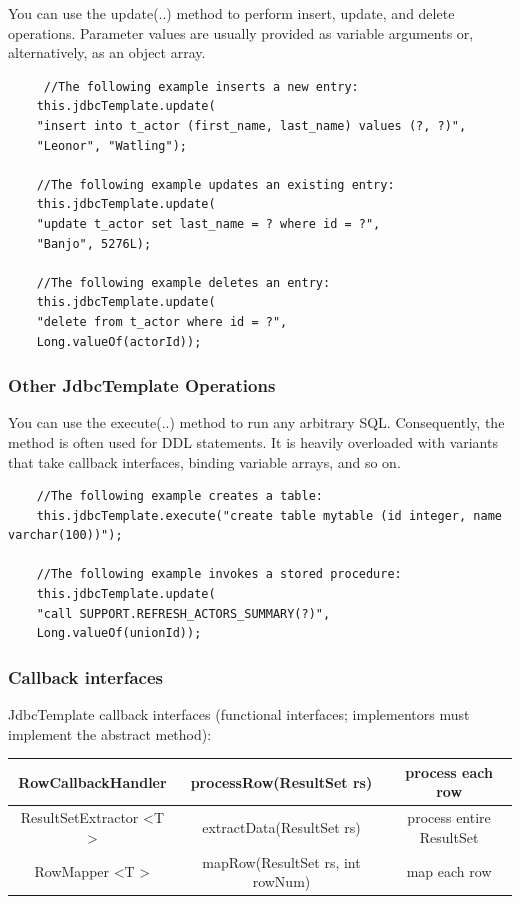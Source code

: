 \documentclass{scrartcl}
\begin{document}
You can use the update(..) method to perform insert, update, and delete operations. Parameter values are usually provided as variable arguments or, alternatively, as an object array.

\begin{lstlisting}
     //The following example inserts a new entry:
    this.jdbcTemplate.update(
    "insert into t_actor (first_name, last_name) values (?, ?)",
    "Leonor", "Watling");

    //The following example updates an existing entry:
    this.jdbcTemplate.update(
    "update t_actor set last_name = ? where id = ?",
    "Banjo", 5276L);

    //The following example deletes an entry:
    this.jdbcTemplate.update(
    "delete from t_actor where id = ?",
    Long.valueOf(actorId));
\end{lstlisting}

\subsubsection{Other JdbcTemplate Operations}

You can use the execute(..) method to run any arbitrary SQL. Consequently, the method is often used for DDL statements. It is heavily overloaded with variants that take callback interfaces, binding variable arrays, and so on.

\begin{lstlisting}
    //The following example creates a table:
    this.jdbcTemplate.execute("create table mytable (id integer, name varchar(100))");

    //The following example invokes a stored procedure:
    this.jdbcTemplate.update(
    "call SUPPORT.REFRESH_ACTORS_SUMMARY(?)",
    Long.valueOf(unionId));
\end{lstlisting}

\subsubsection{Callback interfaces }

JdbcTemplate callback interfaces (functional interfaces; implementors must implement the abstract method):

\begin{tabular}{|c|c|c|}
    \hline
    RowCallbackHandler&  processRow(ResultSet rs)& process each row
    \\
    \hline
    ResultSetExtractor \textless T \textgreater& extractData(ResultSet rs)
    & process entire ResultSet\\
    \hline
    RowMapper \textless T \textgreater& mapRow(ResultSet rs, int rowNum)
    &  map each row \\
    \hline
\end{tabular}
\end{document}
